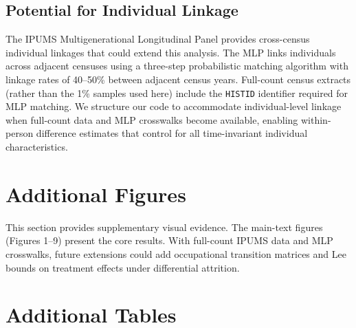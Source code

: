 \documentclass[12pt]{article}
\begin{document}
\subsection{Potential for Individual Linkage}

The IPUMS Multigenerational Longitudinal Panel \citep[MLP version 2.0;][]{ipumsmlp2025} provides cross-census individual linkages that could extend this analysis. The MLP links individuals across adjacent censuses using a three-step probabilistic matching algorithm with linkage rates of 40--50\% between adjacent census years. Full-count census extracts (rather than the 1\% samples used here) include the \texttt{HISTID} identifier required for MLP matching. We structure our code to accommodate individual-level linkage when full-count data and MLP crosswalks become available, enabling within-person difference estimates that control for all time-invariant individual characteristics.


\section{Additional Figures}\label{app:figures}

This section provides supplementary visual evidence. The main-text figures (Figures 1--9) present the core results. With full-count IPUMS data and MLP crosswalks, future extensions could add occupational transition matrices and Lee bounds on treatment effects under differential attrition.


\section{Additional Tables}\label{app:tables}
\end{document}

